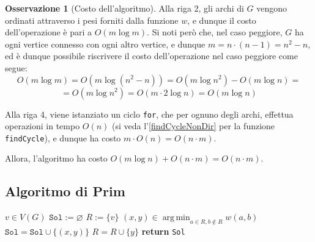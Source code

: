 \documentclass[14pt]{extreport}
\DeclareMathOperator*{\argmin}{arg\,min}
\theoremstyle{definition}
\theoremstyle{definition}
\newtheorem{remark}{Osservazione}[subsection]
\begin{document}
\begin{remark}[Costo dell'algoritmo]
    Alla riga 2, gli archi di $G$ vengono ordinati attraverso i pesi forniti dalla funzione $w$, e dunque il costo dell'operazione è pari a $O(m \log m)$. Si noti però che, nel caso peggiore, $G$ ha ogni vertice connesso con ogni altro vertice, e dunque $m = n\cdot ( n - 1) = n^2 - n$, ed è dunque possibile riscrivere il costo dell'operazione nel caso peggiore come segue: $$O (m \log m) = O(m \log (n^2 - n)) = O(m \log n^2) - O(m \log n) =$$ $$= O(m \log n^2) = O(m \cdot 2 \log n) = O(m \log n)$$

    Alla riga 4, viene istanziato un ciclo \texttt{for}, che per ognuno degli archi, effettua operazioni in tempo $O(n)$ (si veda l'\cref{findCycleNonDir} per la funzione \texttt{findCycle}), e dunque ha costo $m \cdot O(n) = O(n \cdot m)$.

    Allora, l'algoritmo ha costo $O(m \log n) + O(n \cdot m) = O(n \cdot m)$.
\end{remark}

\subsection{Algoritmo di Prim}

\begin{algorithm}[H]
    \caption{
        Dato un grafo indiretto connesso $G$, pesato attraverso $w$ con pesi positivi, l'algoritmo ne restituisce un MST.\\
        \textbf{Input}: $G$ grafo indiretto connesso; $w$ una funzione che associa pesi positivi agli archi in $E(G)$.\\
        \textbf{Output}: un MST di $G$.
    }

    \begin{algorithmic}[1]
            \State $v \in V(G)$
            \State $\texttt{Sol} := \varnothing$
            \State $R := \{v\}$
                \State $\displaystyle (x, y) \in \argmin_{a \in R, b \notin R} {w(a, b)}$
                \State $\texttt{Sol} = \texttt{Sol} \cup \{ (x, y) \}$
                \State $R = R \cup \{y\}$
            \EndWhile
            \State \textbf{return} \texttt{Sol}
        \EndFunction
    \end{algorithmic}
\end{algorithm}
\end{document}
